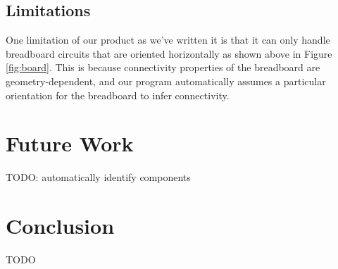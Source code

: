 \documentclass[10pt,twocolumn,letterpaper]{article}
\begin{document}
\subsection{Limitations}

One limitation of our product as we've written it is that it can only handle
breadboard circuits that are oriented horizontally as shown above in Figure
\ref{fig:board}. This is because connectivity properties of the breadboard are
geometry-dependent, and our program automatically assumes a particular
orientation for the breadboard to infer connectivity.  

\section{Future Work}

TODO: automatically identify components

\section{Conclusion}

TODO

{\small


}
\end{document}
